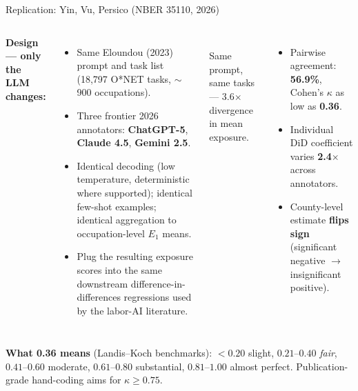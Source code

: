 \begin{frame}{Replication: Yin, Vu, Persico (NBER 35110, 2026)}
\begin{columns}[T]
\textbf{Design --- only the LLM changes:}
\begin{itemize}
\item Same Eloundou (2023) prompt and task list (18{,}797 O*NET tasks, $\sim$900 occupations).
\item Three frontier 2026 annotators: \textbf{ChatGPT-5}, \textbf{Claude 4.5}, \textbf{Gemini 2.5}.
\item Identical decoding (low temperature, deterministic where supported); identical few-shot examples; identical aggregation to occupation-level $E_1$ means.
\item Plug the resulting exposure scores into the same downstream difference-in-differences regressions used by the labor-AI literature.
\end{itemize}

\begin{center}
\\
{\footnotesize Same prompt, same tasks --- 3.6$\times$ divergence in mean exposure.}
\end{center}

\smallskip
\begin{itemize}
\item \scriptsize Pairwise agreement: \textbf{56.9\%}, Cohen's $\kappa$ as low as \textbf{0.36}.
\item \scriptsize Individual DiD coefficient varies \textbf{2.4$\times$} across annotators.
\item \scriptsize County-level estimate \textbf{flips sign} (significant negative $\to$ insignificant positive).
\end{itemize}
\end{columns}

\smallskip
\textbf{What 0.36 means} (Landis--Koch benchmarks): $<\!0.20$ slight, $0.21$--$0.40$ \emph{fair}, $0.41$--$0.60$ moderate, $0.61$--$0.80$ substantial, $0.81$--$1.00$ almost perfect. Publication-grade hand-coding aims for $\kappa \ge 0.75$.
\end{frame}

